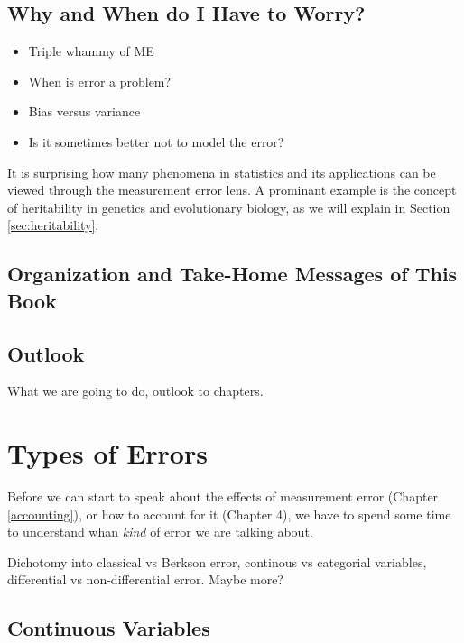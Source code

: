 \documentclass[]{book}
\providecommand{\tightlist}{%
  \setlength{\itemsep}{0pt}\setlength{\parskip}{0pt}}
\theoremstyle{definition}
\theoremstyle{definition}
\theoremstyle{definition}
\theoremstyle{remark}
\begin{document}
\section{Why and When do I Have to
Worry?}\label{why-and-when-do-i-have-to-worry}

\begin{itemize}
\tightlist
\item
  Triple whammy of ME
\item
  When is error a problem?
\item
  Bias versus variance
\item
  Is it sometimes better not to model the error?
\end{itemize}

It is surprising how many phenomena in statistics and its applications
can be viewed through the measurement error lens. A prominant example is
the concept of heritability in genetics and evolutionary biology, as we
will explain in Section \ref{sec:heritability}.

\section{Organization and Take-Home Messages of This
Book}\label{organization-and-take-home-messages-of-this-book}

\section{Outlook}\label{outlook}

What we are going to do, outlook to chapters.

\chapter{Types of Errors}\label{types-of-errors}

Before we can start to speak about the effects of measurement error
(Chapter \ref{accounting}), or how to account for it (Chapter 4), we
have to spend some time to understand whan \emph{kind} of error we are
talking about.

Dichotomy into classical vs Berkson error, continous vs categorial
variables, differential vs non-differential error. Maybe more?

\section{Continuous Variables}\label{sec:errortypes}
\end{document}
